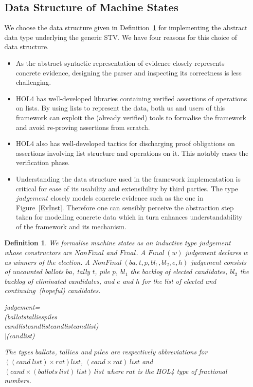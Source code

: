 \documentclass[10pt,conference]{IEEEtran}
\renewcommand{\HOLConst}[1]{{\textsf{\upshape #1}}}
\renewcommand{\HOLTyOp}[1]{\textsf{\itshape #1}}
\renewcommand{\HOLTokenBar}{\ensuremath{\mathtt{|}}}
\newtheorem{definition}{Definition}
\begin{document}
\subsection{Data Structure of Machine States}
\label{MachineData}
 We choose the data structure  given in Definition~\ref{judgement} for implementing the abstract data type underlying the generic STV.  We have four reasons for this choice of data structure. 
 \begin{itemize}
\item As the abstract syntactic representation of evidence closely represents concrete evidence, designing the parser and inspecting its correctness is less challenging.  
 \item HOL4 has well-developed libraries containing verified assertions of operations on lists. By using lists to represent the
 data, both us and users of this framework can 
exploit the (already
 verified) tools to formalise the framework and avoid re-proving
 assertions from scratch.
 \item HOL4 also has well-developed
 tactics for discharging proof obligations on assertions involving list structure and operations on it. This notably eases the verification phase. 
 \item Understanding the data structure used in the framework implementation is critical for ease of its usability and extensibility by third parties.  The type $\mathit{judgement}$ closely models concrete evidence such as the one in Figure~\ref{EvInst}. Therefore one can sensibly perceive the abstraction step taken for modelling concrete data which in turn enhances understandability of the framework and its mechanism. 
   \end{itemize}
\begin{definition}\label{judgement}
We formalise machine states as an inductive type  $\mathit{judgement}$ whose constructors are  $\mathit{NonFinal}$ and $\mathit{Final}$. 
 A $\mathit{Final~(w)}$ judgement declares $w$ as winners of the election. A  $\mathit{NonFinal~(ba,t,p,bl_{1},bl_{2},e,h)}$ judgement  consists of uncounted ballots $ba$, tally $t$, pile $p$, $bl_{1}$ the backlog of elected candidates, $bl_{2}$ the backlog of eliminated candidates, and $e$ and $h$ for the list of elected and continuing~(hopeful) candidates. 
\begin{holthmenv}
\HOLTyOp{judgement}\;=\\
\;\;\;\;\HOLConst{NonFinal}\;(\HOLTyOp{ballots}\;\HOLTokenProd{}\;\HOLTyOp{tallies}\;\HOLTokenProd{}\;\HOLTyOp{piles}\;\HOLTokenProd{}\\\;\;\;\;\;\;\HOLTyOp{cand}\;\HOLTyOp{list}\;\HOLTokenProd{}\;\HOLTyOp{cand}\;\HOLTyOp{list}\;\HOLTokenProd{}\;\HOLTyOp{cand}\;\HOLTyOp{list}\;\HOLTokenProd{}\;\HOLTyOp{cand}\;\HOLTyOp{list})\\
\;\;\HOLTokenBar{}\;\HOLConst{Final}\;(\HOLTyOp{cand}\;\HOLTyOp{list})
\end{holthmenv} 
 The types  $\mathit{ballots}$, $\mathit{tallies}$ and $\mathit{piles}$ are respectively abbreviations for  $\mathit{((cand ~list)\times rat) list}$,   $\mathit{(cand\times rat)~list}$ and $\mathit{(cand\times(ballots~list)~list) ~list}$ where $\mathit{rat}$ is the HOL4 type of fractional numbers.
\end{definition}
\end{document}
